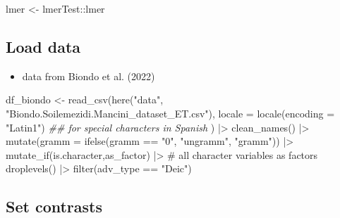 \documentclass[
  letterpaper,
  DIV=11,
  numbers=noendperiod]{scrartcl}
\newenvironment{Shaded}{\begin{snugshade}}{\end{snugshade}}
\newcommand{\AttributeTok}[1]{\textcolor[rgb]{0.40,0.45,0.13}{#1}}
\newcommand{\CommentTok}[1]{\textcolor[rgb]{0.37,0.37,0.37}{#1}}
\newcommand{\DocumentationTok}[1]{\textcolor[rgb]{0.37,0.37,0.37}{\textit{#1}}}
\newcommand{\FloatTok}[1]{\textcolor[rgb]{0.68,0.00,0.00}{#1}}
\newcommand{\FunctionTok}[1]{\textcolor[rgb]{0.28,0.35,0.67}{#1}}
\newcommand{\NormalTok}[1]{\textcolor[rgb]{0.00,0.23,0.31}{#1}}
\newcommand{\OtherTok}[1]{\textcolor[rgb]{0.00,0.23,0.31}{#1}}
\newcommand{\SpecialCharTok}[1]{\textcolor[rgb]{0.37,0.37,0.37}{#1}}
\newcommand{\StringTok}[1]{\textcolor[rgb]{0.13,0.47,0.30}{#1}}
\providecommand{\tightlist}{%
  \setlength{\itemsep}{0pt}\setlength{\parskip}{0pt}}\usepackage{longtable,booktabs,array}
\begin{document}
\begin{Shaded}
\begin{Highlighting}[]
\NormalTok{lmer }\OtherTok{\textless{}{-}}\NormalTok{ lmerTest}\SpecialCharTok{::}\NormalTok{lmer}
\end{Highlighting}
\end{Shaded}

\hypertarget{load-data}{%
\subsection*{Load data}\label{load-data}}

\begin{itemize}
\tightlist
\item
  data from Biondo et al. (2022)
\end{itemize}

\begin{Shaded}
\begin{Highlighting}[]
\NormalTok{df\_biondo }\OtherTok{\textless{}{-}}
  \FunctionTok{read\_csv}\NormalTok{(}\FunctionTok{here}\NormalTok{(}\StringTok{"data"}\NormalTok{, }\StringTok{"Biondo.Soilemezidi.Mancini\_dataset\_ET.csv"}\NormalTok{),}
           \AttributeTok{locale =} \FunctionTok{locale}\NormalTok{(}\AttributeTok{encoding =} \StringTok{"Latin1"}\NormalTok{) }\DocumentationTok{\#\# for special characters in Spanish}
\NormalTok{           ) }\SpecialCharTok{|\textgreater{}} 
  \FunctionTok{clean\_names}\NormalTok{() }\SpecialCharTok{|\textgreater{}} 
  \FunctionTok{mutate}\NormalTok{(}\AttributeTok{gramm =} \FunctionTok{ifelse}\NormalTok{(gramm }\SpecialCharTok{==} \StringTok{"0"}\NormalTok{, }\StringTok{"ungramm"}\NormalTok{, }\StringTok{"gramm"}\NormalTok{)) }\SpecialCharTok{|\textgreater{}} 
  \FunctionTok{mutate\_if}\NormalTok{(is.character,as\_factor) }\SpecialCharTok{|\textgreater{}} \CommentTok{\# all character variables as factors}
  \FunctionTok{droplevels}\NormalTok{() }\SpecialCharTok{|\textgreater{}} 
  \FunctionTok{filter}\NormalTok{(adv\_type }\SpecialCharTok{==} \StringTok{"Deic"}\NormalTok{)}
\end{Highlighting}
\end{Shaded}

\hypertarget{set-contrasts}{%
\subsection{Set contrasts}\label{set-contrasts}}

\begin{Shaded}
\end{Shaded}
\end{document}
